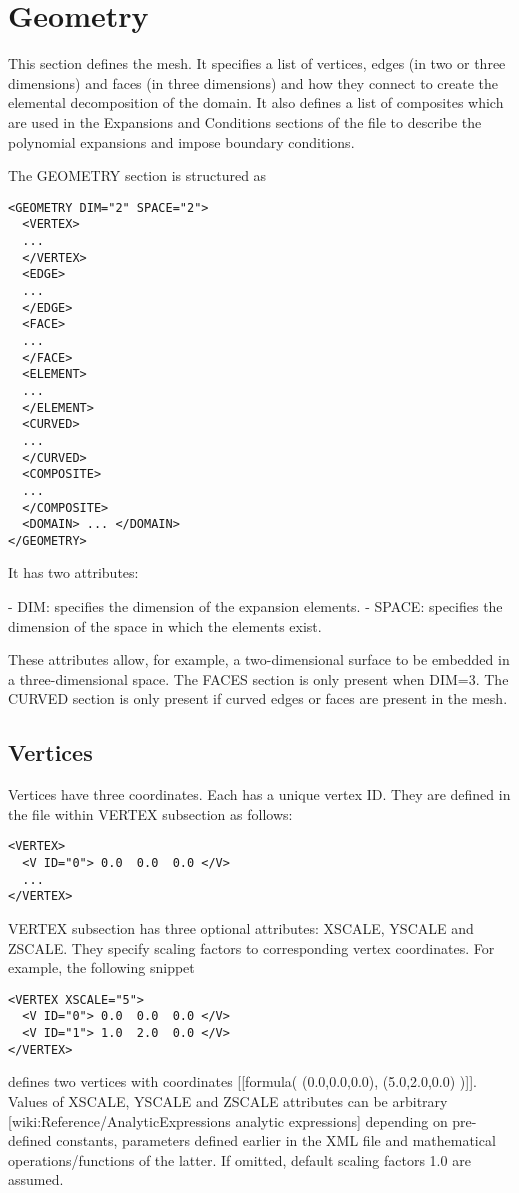 \section{Geometry}
This section defines the mesh. It specifies a list of vertices, edges (in two or three dimensions) and faces (in three dimensions) and how they connect to create the elemental decomposition of the domain. It also defines a list of composites which are used in the Expansions and Conditions sections of the file to describe the polynomial expansions and impose boundary conditions.

The GEOMETRY section is structured as
\begin{lstlisting}[style=XMLStyle]
<GEOMETRY DIM="2" SPACE="2">
  <VERTEX>
  ...
  </VERTEX>
  <EDGE>
  ...
  </EDGE>
  <FACE>
  ...
  </FACE>
  <ELEMENT>
  ...
  </ELEMENT>
  <CURVED>
  ...
  </CURVED>
  <COMPOSITE>
  ...
  </COMPOSITE>
  <DOMAIN> ... </DOMAIN>
</GEOMETRY>
\end{lstlisting}
It has two attributes:

- DIM: specifies the dimension of the expansion elements.
- SPACE: specifies the dimension of the space in which the elements exist.

These attributes allow, for example, a two-dimensional surface to be embedded in a three-dimensional space. The FACES section is only present when DIM=3. The CURVED section is only present if curved edges or faces are present in the mesh.

\subsection{Vertices}

Vertices have three coordinates. Each has a unique vertex ID. They are defined in the file within VERTEX subsection as follows:
\begin{lstlisting}[style=XMLStyle]
<VERTEX>
  <V ID="0"> 0.0  0.0  0.0 </V>
  ...
</VERTEX>
\end{lstlisting}
VERTEX subsection has three optional attributes: {{{XSCALE}}}, {{{YSCALE}}} and {{{ZSCALE}}}. They specify scaling factors to corresponding vertex coordinates. For example, the following snippet
\begin{lstlisting}[style=XMLStyle]
<VERTEX XSCALE="5">
  <V ID="0"> 0.0  0.0  0.0 </V>
  <V ID="1"> 1.0  2.0  0.0 </V>
</VERTEX>
\end{lstlisting}
defines two vertices with coordinates [[formula( (0.0,0.0,0.0), (5.0,2.0,0.0) )]]. Values of {{{XSCALE}}}, {{{YSCALE}}} and {{{ZSCALE}}} attributes can be arbitrary [wiki:Reference/AnalyticExpressions analytic expressions] depending on pre-defined constants, parameters defined earlier in the XML file and mathematical operations/functions of the latter. If omitted, default scaling factors 1.0 are assumed.

